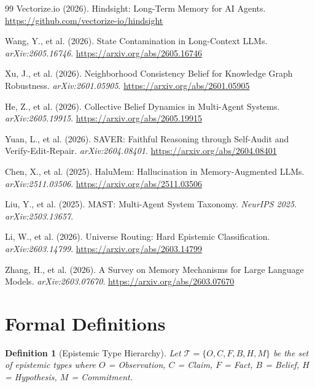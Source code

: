 \documentclass[11pt,letterpaper]{article}
\newtheorem{definition}{Definition}[section]
\begin{document}
\begin{thebibliography}{99}
Vectorize.io (2026).
\newblock Hindsight: Long-Term Memory for AI Agents.
\newblock \url{https://github.com/vectorize-io/hindsight}

Wang, Y., et al. (2026).
\newblock State Contamination in Long-Context LLMs.
\newblock \textit{arXiv:2605.16746}. \url{https://arxiv.org/abs/2605.16746}

Xu, J., et al. (2026).
\newblock Neighborhood Consistency Belief for Knowledge Graph Robustness.
\newblock \textit{arXiv:2601.05905}. \url{https://arxiv.org/abs/2601.05905}

He, Z., et al. (2026).
\newblock Collective Belief Dynamics in Multi-Agent Systems.
\newblock \textit{arXiv:2605.19915}. \url{https://arxiv.org/abs/2605.19915}

Yuan, L., et al. (2026).
\newblock SAVER: Faithful Reasoning through Self-Audit and Verify-Edit-Repair.
\newblock \textit{arXiv:2604.08401}. \url{https://arxiv.org/abs/2604.08401}

Chen, X., et al. (2025).
\newblock HaluMem: Hallucination in Memory-Augmented LLMs.
\newblock \textit{arXiv:2511.03506}. \url{https://arxiv.org/abs/2511.03506}

Liu, Y., et al. (2025).
\newblock MAST: Multi-Agent System Taxonomy.
\newblock \textit{NeurIPS 2025}. \textit{arXiv:2503.13657}.

Li, W., et al. (2026).
\newblock Universe Routing: Hard Epistemic Classification.
\newblock \textit{arXiv:2603.14799}. \url{https://arxiv.org/abs/2603.14799}

Zhang, H., et al. (2026).
\newblock A Survey on Memory Mechanisms for Large Language Models.
\newblock \textit{arXiv:2603.07670}. \url{https://arxiv.org/abs/2603.07670}

\end{thebibliography}

\appendix
\section{Formal Definitions}
\label{app:formal}

\begin{definition}[Epistemic Type Hierarchy]
\label{def:types}
Let $\mathcal{T} = \{O, C, F, B, H, M\}$ be the set of epistemic types where $O$ = Observation, $C$ = Claim, $F$ = Fact, $B$ = Belief, $H$ = Hypothesis, $M$ = Commitment.
\end{definition}
\end{document}
